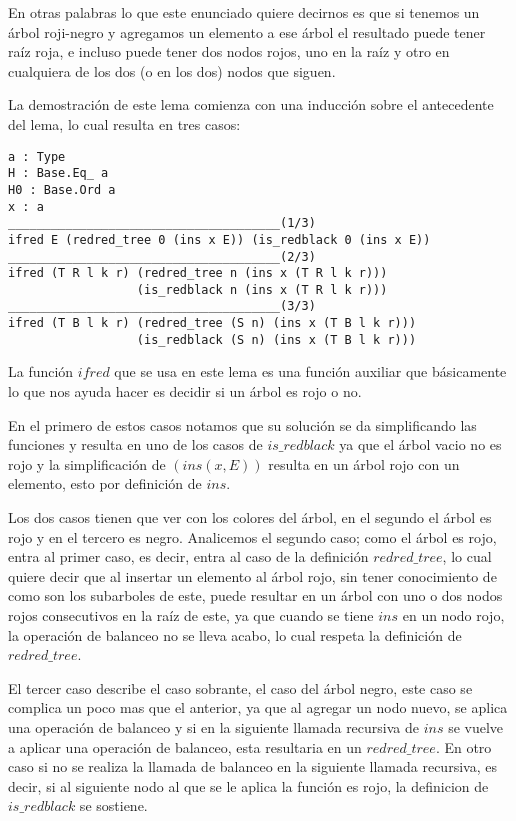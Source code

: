 \documentclass[letterpaper,12pt,oneside]{book}
\newcommand{\arn}{árbol roji-negro }
\theoremstyle{plain}
\theoremstyle{definition}
\theoremstyle{remark}
\begin{document}
 En otras palabras lo que este enunciado quiere decirnos es que si tenemos un \arn y agregamos un elemento a ese \'arbol
 el resultado puede tener ra\'iz roja, e incluso puede tener dos nodos rojos, uno en la ra\'iz y otro en cualquiera de los dos
 (o en los dos) nodos que siguen.

 La demostraci\'on de este lema comienza con una inducci\'on sobre el antecedente del lema, lo cual resulta en tres casos:
 \begin{verbatim}
a : Type
H : Base.Eq_ a
H0 : Base.Ord a
x : a
______________________________________(1/3)
ifred E (redred_tree 0 (ins x E)) (is_redblack 0 (ins x E))
______________________________________(2/3)
ifred (T R l k r) (redred_tree n (ins x (T R l k r))) 
                  (is_redblack n (ins x (T R l k r)))
______________________________________(3/3)
ifred (T B l k r) (redred_tree (S n) (ins x (T B l k r)))
                  (is_redblack (S n) (ins x (T B l k r)))
 \end{verbatim}

 La funci\'on $ifred$ que se usa en este lema es una funci\'on auxiliar que b\'asicamente lo que nos ayuda hacer es decidir si un \'arbol es 
 rojo o no. 

 En el primero de estos casos notamos que su soluci\'on se da simplificando las funciones y resulta en uno de los casos
 de $is\_redblack$ ya que el \'arbol vacio no es rojo y la simplificaci\'on de $(ins(x,E))$ resulta en un \'arbol rojo con un elemento,
 esto por definici\'on de $ins$.

 Los dos casos tienen que ver con los colores del \'arbol, en el segundo el \'arbol es rojo y en el tercero es negro.
 Analicemos el segundo caso; como el \'arbol es rojo, entra al primer caso, es decir, entra al caso de la definici\'on $redred\_tree$,
 lo cual quiere decir que al insertar un elemento al \'arbol rojo, sin tener conocimiento de como son los subarboles de este, puede
 resultar en un \'arbol con uno o dos nodos rojos consecutivos en la ra\'iz de este, ya que cuando se tiene $ins$ en un nodo rojo, la operaci\'on de 
 balanceo no se lleva acabo, lo cual respeta la definici\'on de $redred\_tree$.

 El tercer caso describe el caso sobrante, el caso del \'arbol negro, este caso se complica un poco mas que el anterior, ya que al 
 agregar un nodo nuevo, se aplica una operaci\'on de balanceo y si en la siguiente llamada recursiva de $ins$ se vuelve a aplicar una operaci\'on 
 de balanceo, esta resultaria en un $redred\_tree$. En otro caso si no se realiza la llamada de balanceo en la siguiente llamada recursiva, es decir, si al siguiente nodo al que se le aplica la funci\'on es rojo, la definicion de $is\_redblack$ se sostiene.
\end{document}

